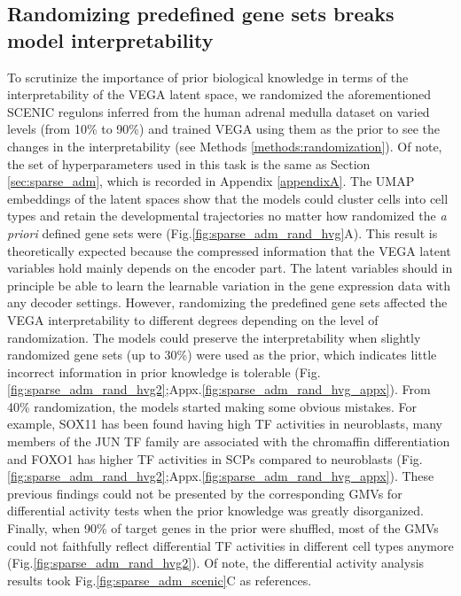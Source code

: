 \subsection{Randomizing predefined gene sets breaks model interpretability}
To scrutinize the importance of prior biological knowledge in terms of the interpretability of the VEGA latent space, we randomized the aforementioned SCENIC regulons inferred from the human adrenal medulla dataset\cite{Jansky2021} on varied levels (from 10\% to 90\%) and trained VEGA using them as the prior to see the changes in the interpretability (see Methods \ref{methods:randomization}). Of note, the set of hyperparameters used in this task is the same as Section \ref{sec:sparse_adm}, which is recorded in Appendix \ref{appendixA}. The UMAP embeddings of the latent spaces show that the models could cluster cells into cell types and retain the developmental trajectories no matter how randomized the \textit{a priori} defined gene sets were (Fig.\ref{fig:sparse_adm_rand_hvg}A). This result is theoretically expected because the compressed information that the VEGA latent variables hold mainly depends on the encoder part. The latent variables should in principle be able to learn the learnable variation in the gene expression data with any decoder settings. However, randomizing the predefined gene sets affected the VEGA interpretability to different degrees depending on the level of randomization. The models could preserve the interpretability when slightly randomized gene sets (up to 30\%) were used as the prior, which indicates little incorrect information in prior knowledge is tolerable (Fig.\ref{fig:sparse_adm_rand_hvg2};Appx.\ref{fig:sparse_adm_rand_hvg_appx}). From 40\% randomization, the models started making some obvious mistakes. For example, SOX11 has been found having high TF activities in neuroblasts, many members of the JUN TF family are associated with the chromaffin differentiation and FOXO1 has higher TF activities in SCPs compared to neuroblasts\cite{Jansky2021} (Fig.\ref{fig:sparse_adm_rand_hvg2};Appx.\ref{fig:sparse_adm_rand_hvg_appx}). These previous findings could not be presented by the corresponding GMVs for differential activity tests when the prior knowledge was greatly disorganized. Finally, when 90\% of target genes in the prior were shuffled, most of the GMVs could not faithfully reflect differential TF activities in different cell types anymore (Fig.\ref{fig:sparse_adm_rand_hvg2}). Of note, the differential activity analysis results took Fig.\ref{fig:sparse_adm_scenic}C as references.

